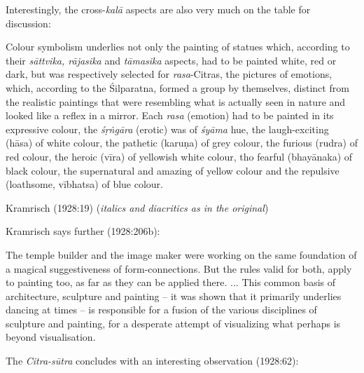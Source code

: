 Interestingly, the cross-\textsl{kalā} aspects are also very much on the table for discussion:

\begin{myquote}
Colour symbolism underlies not only the painting of statues which, according to their \textsl{sāttvika, rājasika} and \textsl{tāmasika} aspects, had to be painted white, red or dark, but was respectively selected for \textsl{rasa}-Citras, the pictures of emotions, which, according to the Śilparatna, formed a group by themselves, distinct from the realistic paintings that were resembling what is actually seen in nature and looked like a reflex in a mirror. Each \textsl{rasa} (emotion) had to be painted in its expressive colour, the \textsl{śṛṅgāra} (erotic) was of \textsl{śyāma} hue, the laugh-exciting (hāsa) of white colour, the pathetic (karuṇa) of grey colour, the furious (rudra) of red colour, the heroic (vīra) of yellowish white colour, tho fearful (bhayānaka) of black colour, the supernatural and amazing of yellow colour and the repulsive (loathsome, vībhatsa) of blue colour.

\hfill Kramrisch (1928:19) (\textsl{italics and diacritics as in the original})
\end{myquote}

Kramrisch says further (1928:206b):

\begin{myquote}
The temple builder and the image maker were working on the same foundation of a magical suggestiveness of form-connections. But the rules valid for both, apply to painting too, as far as they can be applied there. ... This common basis of architecture, sculpture and painting -- it was shown that it primarily underlies dancing at times -- is responsible for a fusion of the various disciplines of sculpture and painting, for a desperate attempt of visualizing what perhaps is beyond visualisation.
\end{myquote}

The \textsl{Citra-sūtra} concludes with an interesting observation (1928:62): 

